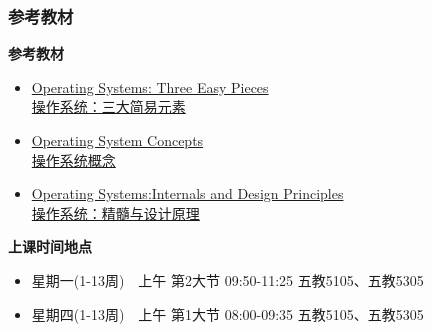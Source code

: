 %
%
\begin{frame}
	\frametitle{参考教材}
	
%		
			\textbf{参考教材}
			\begin{itemize}
				\item \href{http://www.ostep.org/}{Operating Systems: Three Easy Pieces \\ 操作系统：三大简易元素}
				\item \href{http://item.jd.com/10553956.html}{Operating System Concepts \\ 操作系统概念}
				\item \href{http://item.jd.com/10255221.html}{Operating Systems:Internals and Design Principles \\ 操作系统：精髓与设计原理}
			\end{itemize}
			\pause
		
			\textbf{上课时间地点}
			\begin{itemize}
				\item 星期一(1-13周)　上午 第2大节  09:50-11:25  五教5105、五教5305
				\item 星期四(1-13周)　上午 第1大节  08:00-09:35  五教5105、五教5305
		    \end{itemize}
%		
%			
%			
%		
	
\end{frame}

